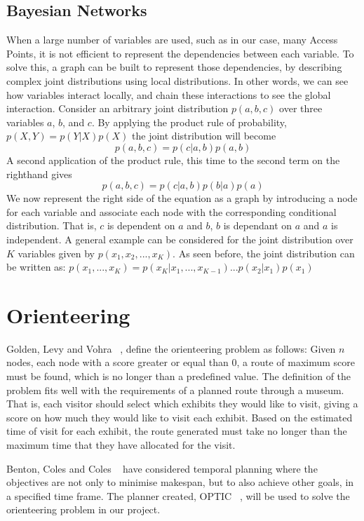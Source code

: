 \subsection{Bayesian Networks}
When a large number of variables are used, such as in our case, many Access Points, it is not efficient to represent the dependencies between each variable. To solve this, a graph can be built to represent those dependencies, by describing complex joint distributions using local distributions. In other words, we can see how variables interact locally, and chain these interactions to see the global interaction.
Consider an arbitrary joint distribution $p(a,b,c)$ over three variables $a$, $b$, and $c$.
By applying the product rule of probability, $p(X,Y) = p(Y|X)p(X)$ the joint distribution will become $$p(a,b,c) = p(c|a,b)p(a,b)$$
A second application of the product rule, this time to the second term on the righthand gives $$p(a,b,c) = p(c|a, b)p(b|a)p(a)$$
We now represent the right side of the equation as a graph by introducing a node for each variable and associate each node with the corresponding conditional distribution. That is, $c$ is dependent on $a$ and $b$, $b$ is dependant on $a$ and $a$ is independent. A general example can be considered for the joint distribution over $K$ variables given by $p(x_1,x_2,...,x_K)$. As seen before, the joint distribution can be written as: $p(x_1,...,x_K) = p(x_K|x_1,...,x_{K-1})...p(x_2|x_1)p(x_1)$

\section{Orienteering}
Golden, Levy and Vohra ~\cite{Golden}, define the orienteering problem as follows: Given $n$ nodes, each node with a score greater or equal than 0, a route of maximum score must be found, which is no longer than a predefined value. The definition of the problem fits well with the requirements of a planned route through a museum. That is, each visitor should select which exhibits they would like to visit, giving a score on how much they would like to visit each exhibit. Based on the estimated time of visit for each exhibit, the route generated must take no longer than the maximum time that they have allocated for the visit.

Benton, Coles and Coles ~\cite{Coles} have considered temporal planning where the objectives are not only to minimise makespan, but to also achieve other goals, in a specified time frame. The planner created, OPTIC ~\cite{OPTIC}, will be used to solve the orienteering problem in our project.







